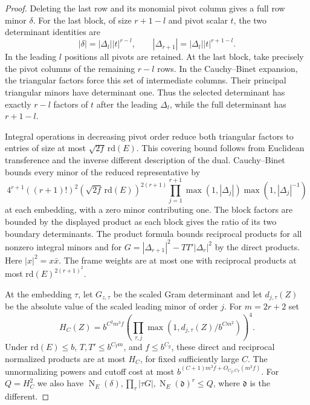 \begin{proof}
Deleting the last row and its
monomial pivot column gives a full row minor \(\delta\).
For the last block, of size \(r+1-l\) and pivot scalar \(t\),
the two determinant identities are
\[
 |\delta|=|\Delta_l||t|^{r-l},\qquad
 |\Delta_{r+1}|=|\Delta_l||t|^{r+1-l}.
\] In the leading \(l\) positions all pivots are retained.
At the last block, take precisely the pivot columns of the
remaining \(r-l\) rows. In the Cauchy--Binet expansion, the
triangular factors force this set of intermediate columns.
Their principal triangular minors have determinant one. Thus
the selected determinant has exactly \(r-l\) factors of \(t\)
after the leading \(\Delta_l\), while the full determinant
has \(r+1-l\).

Integral operations in decreasing pivot order reduce
both triangular factors to entries of size at most
\(\sqrt{2f}\,\mathrm{rd}(E)\). This covering bound follows
from Euclidean transference and the inverse different
description of the dual. \cite{banaszczyk}
Cauchy--Binet bounds every minor of the reduced
representative by
\[
 4^{r+1}((r+1)!)^2(\sqrt{2f}\,\mathrm{rd}(E))^{2(r+1)}
 \prod_{j=1}^{r+1}\max(1,|\Delta_j|)\max(1,|\Delta_j|^{-1})
\]
at each embedding, with a zero minor contributing one.
The block factors are bounded by the displayed product
as each block gives the ratio of its two boundary
determinants. The product formula bounds reciprocal
products for all nonzero integral minors and for
\(G=|\Delta_{r+1}|^2-TT'|\Delta_r|^2\) by the direct
products. Here \(|x|^2=x\bar x\). The frame weights are
at most one with reciprocal products at most
\(\mathrm{rd}(E)^{2(r+1)^2}\).

At the embedding \(\tau\), let \(G_{z,\tau}\) be the scaled Gram determinant and let \(d_{j,\tau}(Z)\) be the absolute value of the scaled leading minor of order \(j\).
For \(m=2r+2\) set
\begin{equation}\label{eq:reduced-flag-height}
 H_C(Z)=b^{C^2m^3f}\left(\prod_{\tau,j}
 \max(1,d_{j,\tau}(Z)/b^{Cm^2})\right)^4.
\end{equation}
Under \(\mathrm{rd}(E)\leq b\), \(T,T'\leq b^{C_Tm}\),
and \(f\leq b^{C_g}\), these direct and reciprocal
normalized products are at most \(H_C\), for fixed
sufficiently large \(C\). The unnormalizing powers and
cutoff cost at most \(b^{(C+1)m^3 f+O_{C_g,C_T}(m^2f)}\).
For \(Q=H_C^2\) we also have
\(\operatorname N_E(\delta),\prod_\tau|\tau G|,
\operatorname N_E(\mathfrak d)^r\leq Q\), where
\(\mathfrak d\) is the different.

\end{proof}

